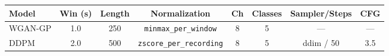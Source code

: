 \begin{tabular}{lccccccc}
\toprule
Model & Win (s) & Length & Normalization & Ch & Classes & Sampler/Steps & CFG \\
\midrule
WGAN-GP & 1.0 & 250 & \texttt{minmax\_per\_window} & 8 & 5 & — & — \\
DDPM & 2.0 & 500 & \texttt{zscore\_per\_recording} & 8 & 5 & ddim / 50 & 3.5 \\
\bottomrule
\end{tabular}